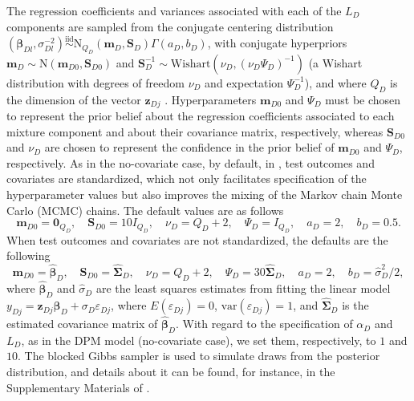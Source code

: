 The regression coefficients and variances associated with each of the $L_D$ components are sampled from the conjugate centering distribution $(\boldsymbol{\beta}_{Dl},\sigma_{Dl}^{-2})\overset{\text{iid}}\sim\text{N}_{Q_D}(\mathbf{m}_D,\mathbf{S}_D)\Gamma(a_D,b_D)$, with conjugate hyperpriors $\mathbf{m}_D\sim\text{N}(\mathbf{m}_{D0},\mathbf{S}_{D0})$ and $\mathbf{S}_D^{-1}\sim\text{Wishart}(\nu_D,(\nu_D\Psi_D)^{-1})$ (a Wishart distribution with degrees of freedom $\nu_D$ and expectation $\Psi_D^{-1}$), and where $Q_D$ is the dimension of the vector $\mathbf{z}_{Dj}$ . Hyperparameters $\mathbf{m}_{D0}$ and $\Psi_D$ must be chosen to represent the prior belief about the regression coefficients associated to each mixture component and about their covariance matrix, respectively, whereas $\mathbf{S}_{D0}$ and $\nu_D$ are chosen to represent the confidence in the prior belief of $\mathbf{m}_{D0}$ and $\Psi_D$, respectively. As in the no-covariate case, by default, in , test outcomes and covariates are standardized, which not only facilitates specification of the hyperparameter values but also improves the mixing of the Markov chain Monte Carlo (MCMC) chains. The default values are as follows
\begin{equation*}	
\mathbf{m}_{D0}=\mathbf{0}_{Q_D}, \quad \mathbf{S}_{D0}=10I_{Q_D},\quad \nu_D=Q_D+2, \quad \Psi_D=I_{Q_D}, \quad a_D=2, \quad b_D=0.5.
\end{equation*}
When test outcomes and covariates are not standardized, the defaults are the following 
\begin{equation*}
\mathbf{m}_{D0}=\widehat{\boldsymbol{\beta}}_D,\quad \mathbf{S}_{D0}=\widehat{\boldsymbol{\Sigma}}_D,\quad \nu_D=Q_D+2,\quad \Psi_D=30\widehat{\boldsymbol{\Sigma}}_D,\quad a_D=2, \quad b_D=\widehat{\sigma}_D^2/2, 
\end{equation*}
where $\widehat{\boldsymbol{\beta}}_D$ and $\widehat{\sigma}_D$ are the least squares estimates from fitting the linear model $y_{Dj}=\mathbf{z}_{Dj}\boldsymbol{\beta}_D+\sigma_D\varepsilon_{Dj}$, where $E(\varepsilon_{Dj})=0$, $\text{var}(\varepsilon_{Dj})=1$, and $\widehat{\boldsymbol{\Sigma}}_D$ is the estimated covariance matrix of $\widehat{\boldsymbol{\beta}}_D$. With regard to the specification of $\alpha_D$ and $L_D$, as in the DPM model (no-covariate case), we set them, respectively, to $1$ and $10$. The blocked Gibbs sampler is used to simulate draws from the posterior distribution, and details about it can be found, for instance, in the Supplementary Materials of \cite{Inacio17}.

